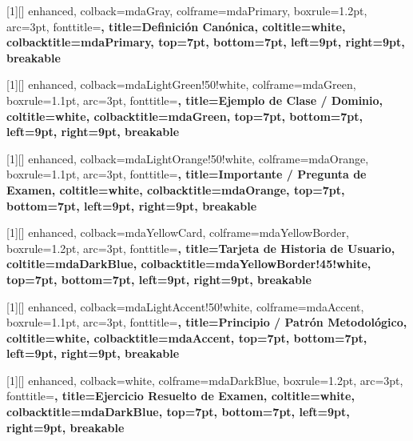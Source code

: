 [1][]{
  enhanced,
  colback=mdaGray,
  colframe=mdaPrimary,
  boxrule=1.2pt,
  arc=3pt,
  fonttitle=\bfseries\sffamily,
  title={Definición Canónica},
  coltitle=white,
  colbacktitle=mdaPrimary,
  top=7pt,
  bottom=7pt,
  left=9pt,
  right=9pt,
  breakable
}

[1][]{
  enhanced,
  colback=mdaLightGreen!50!white,
  colframe=mdaGreen,
  boxrule=1.1pt,
  arc=3pt,
  fonttitle=\bfseries\sffamily,
  title={Ejemplo de Clase / Dominio},
  coltitle=white,
  colbacktitle=mdaGreen,
  top=7pt,
  bottom=7pt,
  left=9pt,
  right=9pt,
  breakable
}

[1][]{
  enhanced,
  colback=mdaLightOrange!50!white,
  colframe=mdaOrange,
  boxrule=1.1pt,
  arc=3pt,
  fonttitle=\bfseries\sffamily,
  title={Importante / Pregunta de Examen},
  coltitle=white,
  colbacktitle=mdaOrange,
  top=7pt,
  bottom=7pt,
  left=9pt,
  right=9pt,
  breakable
}

[1][]{
  enhanced,
  colback=mdaYellowCard,
  colframe=mdaYellowBorder,
  boxrule=1.2pt,
  arc=3pt,
  fonttitle=\bfseries\sffamily\color{mdaDarkBlue},
  title={Tarjeta de Historia de Usuario},
  coltitle=mdaDarkBlue,
  colbacktitle=mdaYellowBorder!45!white,
  top=7pt,
  bottom=7pt,
  left=9pt,
  right=9pt,
  breakable
}

[1][]{
  enhanced,
  colback=mdaLightAccent!50!white,
  colframe=mdaAccent,
  boxrule=1.1pt,
  arc=3pt,
  fonttitle=\bfseries\sffamily,
  title={Principio / Patrón Metodológico},
  coltitle=white,
  colbacktitle=mdaAccent,
  top=7pt,
  bottom=7pt,
  left=9pt,
  right=9pt,
  breakable
}

[1][]{
  enhanced,
  colback=white,
  colframe=mdaDarkBlue,
  boxrule=1.2pt,
  arc=3pt,
  fonttitle=\bfseries\sffamily,
  title={Ejercicio Resuelto de Examen},
  coltitle=white,
  colbacktitle=mdaDarkBlue,
  top=7pt,
  bottom=7pt,
  left=9pt,
  right=9pt,
  breakable
}

